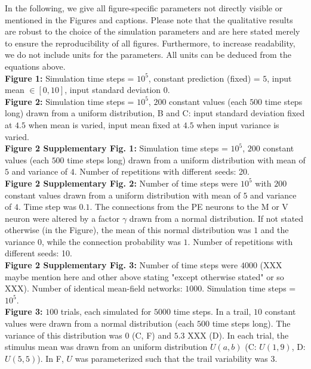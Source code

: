 \documentclass[10pt,a4paper,draft]{article}
\begin{document}
In the following, we give all figure-specific parameters not directly visible or mentioned in the Figures and captions. Please note that the qualitative results are robust to the choice of the simulation parameters and are here stated merely to ensure the reproducibility of all figures. Furthermore, to increase readability, we do not include units for the parameters. All units can be deduced from the equations above.\newline\\ 
%
\textbf{Figure 1:} Simulation time steps = $10^5$, constant prediction (fixed) = $5$, input mean $\in [0,10]$, input standard deviation $0$.\\
%
\textbf{Figure 2:} Simulation time steps = $10^5$, $200$ constant values (each $500$ time steps long) drawn from a uniform distribution, B and C: input standard deviation fixed at $4.5$ when mean is varied, input mean fixed at $4.5$ when input variance is varied.\\
%
\textbf{Figure 2 Supplementary Fig. 1:} Simulation time steps = $10^5$, $200$ constant values (each $500$ time steps long) drawn from a uniform distribution with mean of $5$ and variance of $4$. Number of repetitions with different seeds: 20.\\
%
\textbf{Figure 2 Supplementary Fig. 2:} Number of time steps were $10^5$ with $200$ constant values drawn from a uniform distribution with mean of $5$ and variance of $4$. Time step was $0.1$. The connections from the PE neurons to the M or V neuron were altered by a factor $\gamma$ drawn from a normal distribution. If not stated otherwise (in the Figure), the mean of this normal distribution was $1$ and the variance $0$, while the connection probability was $1$. Number of repetitions with different seeds: 10.\\
%
\textbf{Figure 2 Supplementary Fig. 3:} Number of time steps were $4000$ (XXX maybe mention here and other above stating "except otherwise stated" or so XXX). Number of identical mean-field networks: $1000$.  Simulation time steps = $10^5$.\\
%
\textbf{Figure 3:} $100$ trials, each simulated for $5000$ time steps. In a trail, $10$ constant values were drawn from a normal distribution (each $500$ time steps long). The variance of this distribution was $0$ (C, F)  and $5.3$ XXX (D). In each trial, the stimulus mean was drawn from an uniform distribution $U(a, b)$ (C: $U(1,9)$, D: $U(5,5)$). In F, $U$ was parameterized such that the trail variability was $3$.\\
\end{document}

